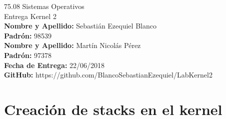 \documentclass[a4paper, 12pt]{article}
\begin{document}
		
	\begin{titlepage}
		\vspace*{\fill}
		\begin{center}
			\Large 75.08 Sistemas Operativos \\
			\Huge Entrega Kernel 2 \\
			\bigskip\bigskip\bigskip
			\large\textbf{Nombre y Apellido:} Sebastián Ezequiel Blanco \\
			\textbf{Padrón:} 98539 \\
			\large\textbf{Nombre y Apellido:} Martín Nicolás Pérez \\
			\textbf{Padrón:} 97378 \\
			\textbf{Fecha de Entrega:} 22/06/2018\\
			\textbf{GitHub:} https://github.com/BlancoSebastianEzequiel/LabKernel2\\

		\end{center}
		\vspace*{\fill}
	\end{titlepage}
	\newpage
			
	\tableofcontents
	\newpage
	
	\section{Creación de stacks en el kernel}
\end{document}
